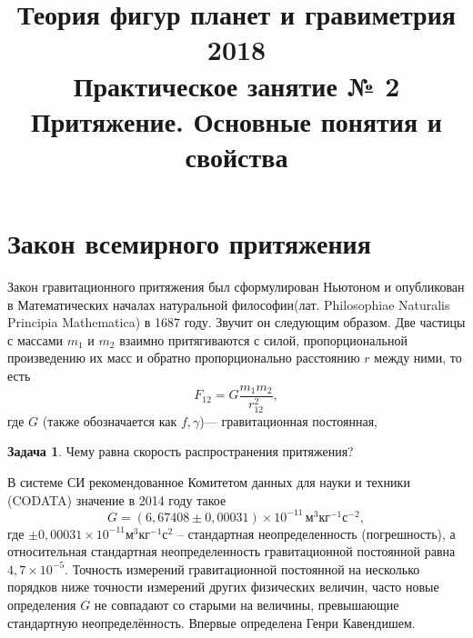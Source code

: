 \documentclass[11pt, a4paper]{article}
\title{{\Large Теория фигур планет и гравиметрия 2018}\\ 
    {\bf\Large Практическое занятие № 2} \\
{\Large Притяжение. Основные понятия и свойства}}
\author{}
\date{\DTMusedate{lessondate}}
\theoremstyle{plain}
\theoremstyle{definition}
\newtheorem{problem}{Задача}[section]
\theoremstyle{remark}
\begin{document}
\maketitle

\section{Закон всемирного притяжения}

Закон гравитационного притяжения был сформулирован Ньютоном и опубликован в Математических началах
натуральной философии\cite{Newton1687}(лат. Philosophiae Naturalis Principia Mathematica) в 1687
году.
Звучит он следующим образом. Две частицы с массами $m_1$ и $m_2$ взаимно притягиваются с силой,
пропорциональной произведению их масс и обратно пропорционально расстоянию $r$ между ними, то есть
\begin{equation*}
    F_{12} = G\dfrac{m_1m_2}{r_{12}^2},
\end{equation*}
где $G$ (также обозначается как $f,\gamma$)--- гравитационная постоянная, 

\begin{problem}
    Чему равна скорость распространения притяжения?
\end{problem}

В системе СИ рекомендованное Комитетом данных для науки и техники (CODATA) значение в 2014
году\cite{CODATA2014} такое
\begin{equation*}
    G = (6,67408 \pm 0,00031)\times10^{-11}\,\text{м}^3\text{кг}^{-1}\text{с}^{-2},
\end{equation*}
где $\pm0,00031\times10^{-11}\text{м}^3\text{кг}^{-1}\text{с}^2$ -- стандартная неопределенность
(погрешность), а относительная стандартная неопределенность гравитационной постоянной
равна $4,7\times10^{-5}$. Точность измерений гравитационной постоянной на несколько порядков ниже
точности измерений других физических величин,  часто новые определения $G$ не совпадают со старыми
на величины, превышающие стандартную неопределённость. Впервые определена Генри Кавендишем.
\end{document}
